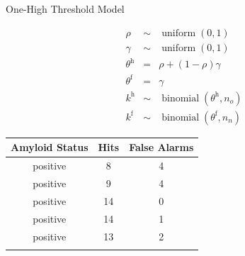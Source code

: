 \documentclass[10pt]{beamer}
\begin{document}
\begin{frame}[fragile]{One-High Threshold Model}

	\begin{minipage}{0.45\textwidth}
		\begin{eqnarray*}
			\rho &\sim& \operatorname{uniform}\left(0, 1\right) \\
			\gamma &\sim&\operatorname{uniform}\left(0, 1\right) \\
			\theta^\mathrm{h} &=& {\rho} + {\left(1-\rho\right)\gamma} \\
			\theta^\mathrm{f} &=& {\gamma} \\
			k^\mathrm{h} &\sim& \operatorname{binomial}\left(\theta^\mathrm{h}, n_o\right) \\
			k^\mathrm{f} &\sim& \operatorname{binomial}\left(\theta^\mathrm{f}, n_n\right)
		\end{eqnarray*}
	\end{minipage}\hfill
	\begin{minipage}{0.45\textwidth}
		\begin{tabular}{ccc}
			Amyloid Status          & Hits           & False Alarms   \\
			\hline
			{\color{red}~positive~} & {\color{red}8} & {\color{red}4} \\
			{\color{red}~positive~} & {\color{red}9} & {\color{red}4} \\
			~positive~              & 14             & 0              \\
			~positive~              & 14             & 1              \\
			~positive~              & 13             & 2              \\
			\textellipsis           & \textellipsis  & \textellipsis  \\
		\end{tabular}
	\end{minipage}\hspace{1cm}

\end{frame}
\end{document}
